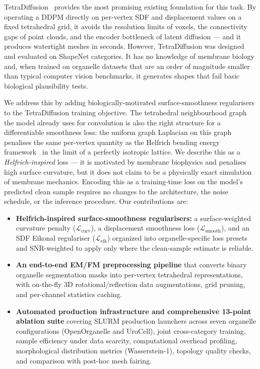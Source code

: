 \documentclass[10pt, a4paper, twocolumn]{article}
\begin{document}
TetraDiffusion~\cite{kalischek2022tetradiffusion} provides the most promising existing foundation for this task. By operating a DDPM directly on per-vertex SDF and displacement values on a fixed tetrahedral grid, it avoids the resolution limits of voxels, the connectivity gaps of point clouds, and the encoder bottleneck of latent diffusion — and it produces watertight meshes in seconds. However, TetraDiffusion was designed and evaluated on ShapeNet categories. It has no knowledge of membrane biology and, when trained on organelle datasets that are an order of magnitude smaller than typical computer vision benchmarks, it generates shapes that fail basic biological plausibility tests.

We address this by adding biologically-motivated surface-smoothness regularisers to the TetraDiffusion training objective. The tetrahedral neighbourhood graph the model already uses for convolution is also the right structure for a differentiable smoothness loss: the uniform graph Laplacian on this graph penalises the same per-vertex quantity as the Helfrich bending energy framework~\cite{helfrich1973elastic} in the limit of a perfectly isotropic lattice. We describe this as a \emph{Helfrich-inspired} loss — it is motivated by membrane biophysics and penalises high surface curvature, but it does not claim to be a physically exact simulation of membrane mechanics. Encoding this as a training-time loss on the model's predicted clean sample requires no changes to the architecture, the noise schedule, or the inference procedure. Our contributions are:

\begin{itemize}
    \item \textbf{Helfrich-inspired surface-smoothness regularisers:} a surface-weighted curvature penalty ($\mathcal{L}_{\text{curv}}$), a displacement smoothness loss ($\mathcal{L}_{\text{smooth}}$), and an SDF Eikonal regulariser ($\mathcal{L}_{\text{eik}}$) organized into organelle-specific loss presets and SNR-weighted to apply only where the clean-sample estimate is reliable.
    \item \textbf{An end-to-end EM/FM preprocessing pipeline} that converts binary organelle segmentation masks into per-vertex tetrahedral representations, with on-the-fly 3D rotational/reflection data augmentations, grid pruning, and per-channel statistics caching.
    \item \textbf{Automated production infrastructure and comprehensive 13-point ablation suite} covering SLURM production launchers across seven organelle configurations (OpenOrganelle and UroCell), joint cross-category training, sample efficiency under data scarcity, computational overhead profiling, morphological distribution metrics (Wasserstein-1), topology quality checks, and comparison with post-hoc mesh fairing.
\end{itemize}
\end{document}
